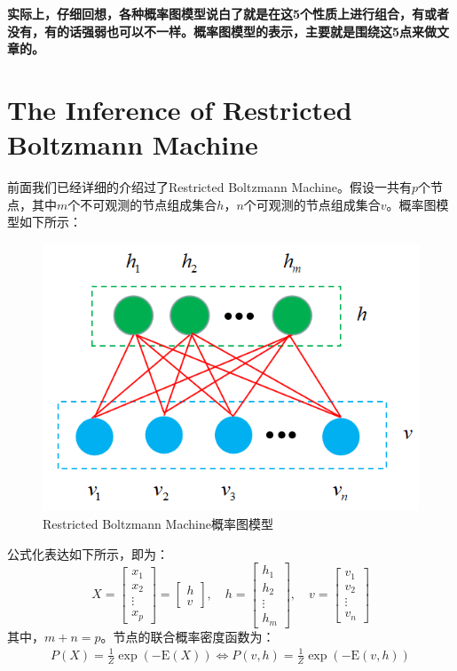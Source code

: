 \documentclass[a4paper]{article}
\begin{document}
\textbf{实际上，仔细回想，各种概率图模型说白了就是在这5个性质上进行组合，有或者没有，有的话强弱也可以不一样。概率图模型的表示，主要就是围绕这5点来做文章的。}

\section{The Inference of Restricted Boltzmann Machine}
前面我们已经详细的介绍过了Restricted Boltzmann Machine。假设一共有$p$个节点，其中$m$个不可观测的节点组成集合$h$，$n$个可观测的节点组成集合$v$。概率图模型如下所示：
\begin{figure}[H]
    \centering
    \includegraphics[width=.45\textwidth]{微信图片_20200229233931.png}
    \caption{Restricted Boltzmann Machine概率图模型}
    
\end{figure}
公式化表达如下所示，即为：
\begin{equation}
    X = \begin{bmatrix}
    x_1 \\
    x_2 \\
    \vdots \\
    x_p
    \end{bmatrix}
    = 
    \begin{bmatrix}
    h \\
    v
    \end{bmatrix}
    ,\quad
    h = 
    \begin{bmatrix}
    h_1 \\
    h_2\\
    \vdots \\
    h_m
    \end{bmatrix}
    ,\quad
    v = 
    \begin{bmatrix}
    v_1 \\
    v_2\\
    \vdots \\
    v_n
    \end{bmatrix}
\end{equation}
其中，$m+n=p$。节点的联合概率密度函数为：
\begin{equation}
    \begin{split}
        P(X) 
        =  \frac{1}{Z} \exp (-\mathrm{E}(X)) 
        \Longleftrightarrow P(v,h) 
        =   \frac{1}{Z} \exp (-\mathrm{E}(v,h)) \\
    \end{split}
\end{equation}
\end{document}

